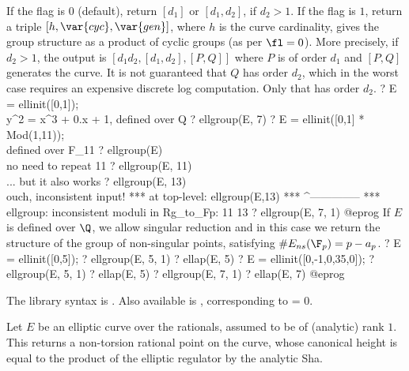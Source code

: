 If the flag is $0$ (default), return $[d_1]$ or $[d_1, d_2]$, if $d_2>1$.
If the flag is $1$, return a triple $[h,\var{cyc},\var{gen}]$, where
$h$ is the curve cardinality,  gives the group structure as a
product of cyclic groups (as per $\fl = 0$). More precisely, if $d_2 > 1$,
the output is $[d_1d_2, [d_1,d_2],[P,Q]]$ where $P$ is
of order $d_1$ and $[P,Q]$ generates the curve.
 It is not guaranteed that $Q$ has order $d_2$, which in
the worst case requires an expensive discrete log computation. Only that
 has order $d_2$.
\bprog
? E = ellinit([0,1]);  \\ y^2 = x^3 + 0.x + 1, defined over Q
? ellgroup(E, 7)
? E = ellinit([0,1] * Mod(1,11));  \\ defined over F_11
? ellgroup(E)   \\ no need to repeat 11
? ellgroup(E, 11)   \\ ... but it also works
? ellgroup(E, 13) \\ ouch, inconsistent input!
   ***   at top-level: ellgroup(E,13)
   ***                 ^--------------
   *** ellgroup: inconsistent moduli in Rg_to_Fp:
     11
     13
? ellgroup(E, 7, 1)
@eprog\noindent
If $E$ is defined over $\Q$, we allow singular reduction and in this case we
return the structure of the group of non-singular points, satisfying
$\#E_{ns}(\F_p) = p - a_p$.
\bprog
? E = ellinit([0,5]);
? ellgroup(E, 5, 1)
? ellap(E, 5)
? E = ellinit([0,-1,0,35,0]);
? ellgroup(E, 5, 1)
? ellap(E, 5)
? ellgroup(E, 7, 1)
? ellap(E, 7)
@eprog

The library syntax is .
Also available is , corresponding
to \fl = 0.

\label{se:ellheegner}
Let $E$ be an elliptic curve over the rationals, assumed to be of
(analytic) rank $1$. This returns a non-torsion rational point on the curve,
whose canonical height is equal to the product of the elliptic regulator by the
analytic Sha.

